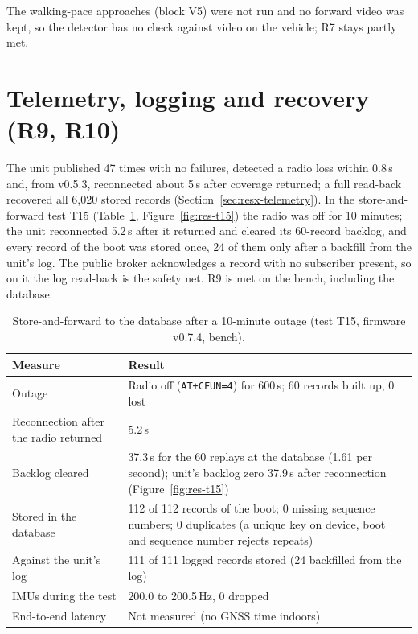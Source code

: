 The walking-pace approaches (block V5) were not run and no forward video was kept, so the detector has no check against video on the vehicle; R7 stays partly met.

\section{Telemetry, logging and recovery (R9, R10)}
\label{sec:res-telemetry}

The unit published 47 times with no failures, detected a radio loss within 0.8\,s and, from v0.5.3, reconnected about 5\,s after coverage returned; a full read-back recovered all 6,020 stored records (Section~\ref{sec:resx-telemetry}). In the store-and-forward test T15 (Table~\ref{tab:res-sync}, Figure~\ref{fig:res-t15}) the radio was off for 10 minutes; the unit reconnected 5.2\,s after it returned and cleared its 60-record backlog, and every record of the boot was stored once, 24 of them only after a backfill from the unit's log. The public broker acknowledges a record with no subscriber present, so on it the log read-back is the safety net. R9 is met on the bench, including the database.

\begin{table}[htbp]
\centering
\caption[Store-and-forward to the database after a 10-minute outage (test T15, firmware v0.7.4, bench)]{Store-and-forward to the database after a 10-minute outage (test T15, firmware v0.7.4, bench).}
\label{tab:res-sync}
\begin{tabular}{|p{6.2cm}|p{7.6cm}|}
\hline
\textbf{Measure} & \textbf{Result} \\ \hline
Outage & Radio off (\texttt{AT+CFUN=4}) for 600\,s; 60 records built up, 0 lost \\ \hline
Reconnection after the radio returned & 5.2\,s \\ \hline
Backlog cleared & 37.3\,s for the 60 replays at the database (1.61 per second); unit's backlog zero 37.9\,s after reconnection (Figure~\ref{fig:res-t15}) \\ \hline
Stored in the database & 112 of 112 records of the boot; 0 missing sequence numbers; 0 duplicates (a unique key on device, boot and sequence number rejects repeats) \\ \hline
Against the unit's log & 111 of 111 logged records stored (24 backfilled from the log) \\ \hline
IMUs during the test & 200.0 to 200.5\,Hz, 0 dropped \\ \hline
End-to-end latency & Not measured (no GNSS time indoors) \\ \hline
\end{tabular}
\end{table}

